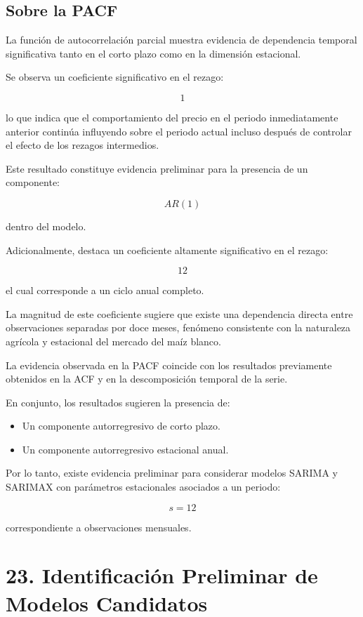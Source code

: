 \documentclass[11pt]{article}
\providecommand{\tightlist}{%
      \setlength{\itemsep}{0pt}\setlength{\parskip}{0pt}}
\begin{document}
    \hypertarget{sobre-la-pacf}{%
\subsection{Sobre la PACF}\label{sobre-la-pacf}}

La función de autocorrelación parcial muestra evidencia de dependencia
temporal significativa tanto en el corto plazo como en la dimensión
estacional.

Se observa un coeficiente significativo en el rezago:

\[
1
\]

lo que indica que el comportamiento del precio en el periodo
inmediatamente anterior continúa influyendo sobre el periodo actual
incluso después de controlar el efecto de los rezagos intermedios.

Este resultado constituye evidencia preliminar para la presencia de un
componente:

\[
AR(1)
\]

dentro del modelo.

Adicionalmente, destaca un coeficiente altamente significativo en el
rezago:

\[
12
\]

el cual corresponde a un ciclo anual completo.

La magnitud de este coeficiente sugiere que existe una dependencia
directa entre observaciones separadas por doce meses, fenómeno
consistente con la naturaleza agrícola y estacional del mercado del maíz
blanco.

La evidencia observada en la PACF coincide con los resultados
previamente obtenidos en la ACF y en la descomposición temporal de la
serie.

En conjunto, los resultados sugieren la presencia de:

\begin{itemize}
\tightlist
\item
  Un componente autorregresivo de corto plazo.
\item
  Un componente autorregresivo estacional anual.
\end{itemize}

Por lo tanto, existe evidencia preliminar para considerar modelos SARIMA
y SARIMAX con parámetros estacionales asociados a un periodo:

\[
s = 12
\]

correspondiente a observaciones mensuales.

    \hypertarget{identificaciuxf3n-preliminar-de-modelos-candidatos}{%
\section{23. Identificación Preliminar de Modelos
Candidatos}\label{identificaciuxf3n-preliminar-de-modelos-candidatos}}
\end{document}
